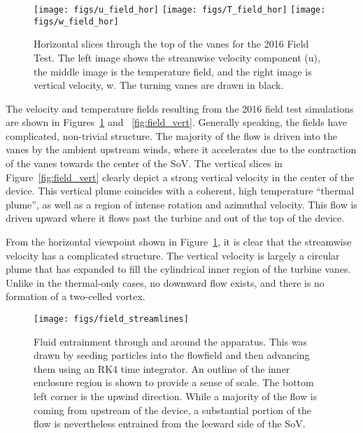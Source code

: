 \begin{figure}[!htb]
  \centering
  \texttt{[image: figs/u\_field\_hor]}
  \hfill
  \texttt{[image: figs/T\_field\_hor]}
  \hfill
  \texttt{[image: figs/w\_field\_hor]}
 \caption{Horizontal slices through the top of the vanes for the
 2016 Field Test. The left image shows the streamwise velocity component
 (u), the middle image is the temperature field, and the right image is
 vertical velocity, w. The turning vanes are drawn in black.}  
 \label{fig:field_hor}
\end{figure}

The velocity and temperature fields resulting from the 2016 field test   
simulations are shown in Figures~\ref{fig:field_hor} and
~\ref{fig:field_vert}. Generally speaking, the fields have
complicated, non-trivial structure. The majority of the flow is driven
into the vanes by the ambient upstream winds, where it accelerates due
to the contraction of the vanes towards the center of the SoV.
The vertical slices in Figure~\ref{fig:field_vert} clearly depict a
strong vertical velocity in the center of the device. This vertical
plume coincides with a coherent, high temperature ``thermal plume'', as
well as a region of intense rotation and azimuthal velocity. This flow
is driven upward where it flows past the turbine and out of the top of
the device. 

From the horizontal viewpoint shown in Figure~\ref{fig:field_hor}, it is
clear that the streamwise velocity has a complicated structure. The
vertical velocity is largely a circular plume that has expanded to fill
the cylindrical inner region of the turbine vanes. Unlike in the
thermal-only cases, no downward flow exists, and there is no formation
of a two-celled vortex. 

\begin{figure}[!htb]
  \centering
  \texttt{[image: figs/field\_streamlines]}
 \caption{Fluid entrainment through and around the apparatus. This was
 drawn by seeding particles into the flowfield and then advancing them  
 using an RK4 time integrator. An outline of the inner enclosure region 
 is shown to provide a sense of scale. The bottom left corner is the
 upwind direction. While a majority of the flow is coming from upstream
 of the device, a substantial portion of the flow is nevertheless
 entrained from the leeward side of the SoV. }  
 \label{fig:field_stream}
\end{figure}

